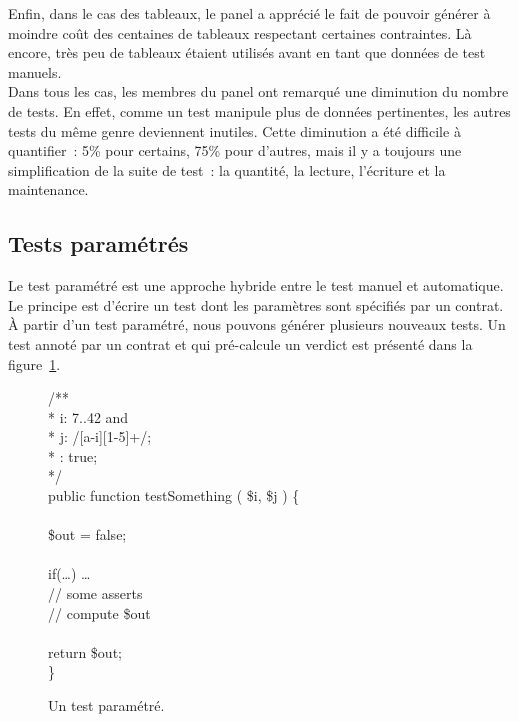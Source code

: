 Enfin, dans le cas des tableaux, le panel a apprécié le fait de pouvoir générer
à moindre coût des centaines de tableaux respectant certaines contraintes. Là
encore, très peu de tableaux étaient utilisés avant en tant que données de test
manuels. \\

Dans tous les cas, les membres du panel ont remarqué une diminution du nombre de
tests. En effet, comme un test manipule plus de données pertinentes, les autres
tests du même genre deviennent inutiles. Cette diminution a été difficile à
quantifier~: 5\% pour certains, 75\% pour d'autres, mais il y a toujours une
simplification de la suite de test~: la quantité, la lecture, l'écriture et la
maintenance.

\subsection{Tests paramétrés}
\label{subsection:experimentation:parameterized}

Le test paramétré est une approche hybride entre le test manuel et automatique.
Le principe est d'écrire un test dont les paramètres sont spécifiés par un
contrat. À partir d'un test paramétré, nous pouvons générer plusieurs nouveaux
tests. Un test annoté par un contrat et qui pré-calcule un verdict est présenté
dans la figure~\ref{figure:experimentation:parameterized}.
%
\begin{figure}

\begin{pre}
/** \\
 * \arequires i: 7..42 and \\
 *           j: /[a-i][1-5]+/; \\
 * \aensures  \aresult: true; \\
 */ \\
public function testSomething ( \$i, \$j ) \{ \\
 \\
    \$out = false; \\
 \\
    if(…) … \\
    // some asserts \\
    // compute \$out \\
 \\
    return \$out; \\
\}
\end{pre}

\caption{\label{figure:experimentation:parameterized} Un test paramétré.}

\end{figure}

